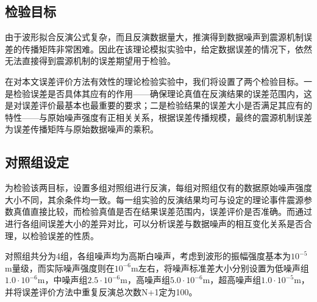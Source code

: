 \subsection{检验目标}
由于波形拟合反演公式复杂，而且反演数据量大，推演得到数据噪声到震源机制误差的传播矩阵非常困难。因此在该理论模拟实验中，给定数据误差的情况下，依然无法直接得到震源机制的误差期望用于检验。

在对本文误差评价方法有效性的理论检验实验中，我们将设置了两个检验目标。一是检验误差是否具体其应有的作用——确保理论真值在反演结果的误差范围内，这是对误差评价最基本也最重要的要求；二是检验结果的误差大小是否满足其应有的特性——与原始噪声强度有正相关关系，根据误差传播规模，最终的震源机制误差为误差传播矩阵与原始数据噪声的乘积。

\subsection{对照组设定}
为检验该两目标，设置多组对照组进行反演，每组对照组仅有的数据原始噪声强度大小不同，其余条件均一致。每一组实验的反演结果均可与设定的理论事件震源参数真值直接比较，而检验真值是否在结果误差范围内，误差评价是否准确。而通过进行各组间误差大小的差异对比，可以分析误差与数据噪声的相互变化关系是否合理，以检验误差的性质。

对照组共分为4组，各组噪声均为高斯白噪声，考虑到波形的振幅强度基本为$10^{-5}$m量级，而实际噪声强度则在$10^{-6}$m左右，将噪声标准差大小分别设置为低噪声组$1.0\cdot10^{-6}$m，中噪声组$2.5\cdot10^{-6}$m，高噪声组$5.0\cdot10^{-6}$m，超高噪声组$1.0\cdot10^{-5}$m，并将误差评价方法中重复反演总次数N+1定为100。


